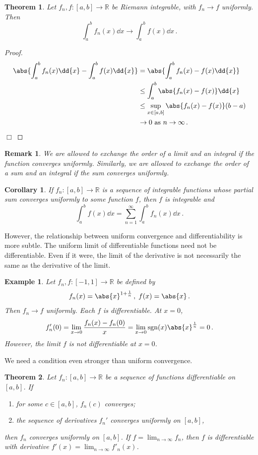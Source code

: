 \documentclass{article}
\theoremstyle{plain}\theoremheaderfont{\normalfont\itshape}\theorembodyfont{\rmfamily}\theoremseparator{.}\newtheorem*{rem}{Remark}\newtheorem*{ex}{Example}\newtheorem*{proof}{Proof}\newtheorem*{altp}{Alternative proof}
\theoremstyle{plain}\theoremheaderfont{\normalfont\bfseries}\theorembodyfont{\rmfamily}\theoremseparator{.}\newtheorem{thm}{Theorem}[section]\newtheorem{lem}[thm]{Lemma}\newtheorem{prop}[thm]{Proposition}\newtheorem*{cor}{Corollary}\newtheorem{defn}[thm]{Definition}\newtheorem{clm}[thm]{Claim}\newtheorem{clminproof}{Claim}
\theoremstyle{break}\theoremheaderfont{\normalfont\itshape}\theorembodyfont{\rmfamily}\theoremseparator{.\medskip}\newtheorem*{proofskip}{Proof}\newtheorem*{exs}{Examples}\newtheorem*{rems}{Remarks}
\theoremstyle{break}\theoremheaderfont{\normalfont\bfseries}\theorembodyfont{\rmfamily}\theoremseparator{.\medskip}\newtheorem{lemskip}[thm]{Lemma}\newtheorem{defnskip}[thm]{Definition}\newtheorem{propskip}[thm]{Proposition}\newtheorem{thmskip}[thm]{Theorem}
\numberwithin{equation}{section}
\newcommand{\qed}{\hfill\ensuremath{\Box}}
\begin{document}
	\begin{thm}
		Let \(f_n,f:[a,b]\to\mathbb{R}\) be Riemann integrable, with \(f_n\to f\) uniformly. Then
		\[\int_{a}^{b}f_n(x)\dd{x}\to\int_{a}^{b}f(x)\dd{x}\,.\]
	\end{thm}
	\begin{proof}
		\begin{align*}
			\abs{\int_{a}^{b}f_n(x)\dd{x}-\int_{a}^{b}f(x)\dd{x}}&=\abs{\int_{a}^{b}f_n(x)-f(x)\dd{x}}\\
			&\le\int_{a}^{b}\abs{f_n(x)-f(x)}\dd{x}\\
			&\le\sup_{x\in[a,b]}\abs{f_n(x)-f(x)}(b-a)\\
			&\to 0 \text{ as }n\to\infty\,.
		\end{align*}\qed
	\end{proof}
	\begin{rem}
		We are allowed to exchange the order of a limit and an integral if the function converges uniformly. Similarly, we are allowed to exchange the order of a sum and an integral if the sum converges uniformly.
	\end{rem}
	\begin{cor}
		If \(f_n:[a,b]\to\mathbb{R}\) is a sequence of integrable functions whose partial sum converges uniformly to some function \(f\), then \(f\) is integrable and
		\[\int_{a}^{b}f(x)\dd{x}=\sum_{n=1}^{\infty}\int_{a}^{b}f_n(x)\dd{x}\,.\]
	\end{cor}

	However, the relationship between uniform convergence and differentiability is more subtle. The uniform limit of differentiable functions need not be differentiable. Even if it were, the limit of the derivative is not necessarily the same as the derivative of the limit.
	\begin{ex}
		Let \(f_n,f:[-1,1]\to\mathbb{R}\) be defined by
		\[f_n(x)=\abs{x}^{1+\frac{1}{n}}\,,\; f(x)=\abs{x}\,.\]
		Then \(f_n\to f\) uniformly. Each \(f\) is differentiable. At \(x=0\),
		\[f_n'(0)=\lim_{x\to 0}\frac{f_n(x)-f_n(0)}{x}=\lim_{x\to 0}\mathrm{sgn}(x)\abs{x}^{\frac{1}{n}}=0\,.\]
		However, the limit \(f\) is not differentiable at \(x=0\).
	\end{ex}
	We need a condition even stronger than uniform convergence.
	\begin{thm}
		Let \(f_n:[a,b]\to\mathbb{R}\) be a sequence of functions differentiable on \([a,b]\). If
		\begin{enumerate}[topsep=0pt]
			\item for some \(c\in[a,b]\), \(f_n(c)\) converges;
			\item the sequence of derivatives \(f_n'\) converges uniformly on \([a,b]\),
		\end{enumerate}
		then \(f_n\) converges uniformly on \([a,b]\). If \(f=\lim_{n\to\infty}f_n\), then \(f\) is differentiable with derivative \(f'(x)=\lim_{n\to\infty}f'_n(x)\).
	\end{thm}
\end{document}
